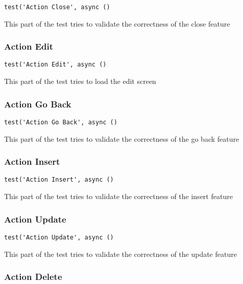 \documentclass[a4paper]{article}
\begin{document}
\begin{lstlisting}
test('Action Close', async ()
\end{lstlisting}

This part of the test tries to validate the correctness of the close feature

\hypertarget{toc124}{}
\subsubsection{Action Edit}

\begin{lstlisting}
test('Action Edit', async ()
\end{lstlisting}

This part of the test tries to load the edit screen

\hypertarget{toc125}{}
\subsubsection{Action Go Back}

\begin{lstlisting}
test('Action Go Back', async ()
\end{lstlisting}

This part of the test tries to validate the correctness of the go back feature

\hypertarget{toc126}{}
\subsubsection{Action Insert}

\begin{lstlisting}
test('Action Insert', async ()
\end{lstlisting}

This part of the test tries to validate the correctness of the insert feature

\hypertarget{toc127}{}
\subsubsection{Action Update}

\begin{lstlisting}
test('Action Update', async ()
\end{lstlisting}

This part of the test tries to validate the correctness of the update feature

\hypertarget{toc128}{}
\subsubsection{Action Delete}
\end{document}
